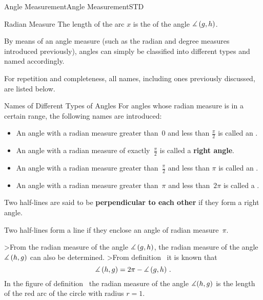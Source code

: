 \begin{MXContent}{Angle Measurement}{Angle Measurement}{STD}
\begin{MXInfo}{Radian Measure}
The length of the arc $x$ is the  of the
angle $\measuredangle \left( g, h \right)$.
\end{MXInfo}

By means of an angle measure (such as the radian and degree measures
introduced previously), angles can simply be classified into different types and named 
accordingly. 

For repetition and completeness, all names, including ones previously discussed, are listed 
below.

\begin{MXInfo}{Names of Different Types of Angles}
For angles whose radian measure is in a certain range, the following names 
are introduced:

\begin{itemize}
\item
An angle with a radian measure greater than~$0$ and less than $\frac{\pi}{2}$ is called an
.
       
\item
An angle with a radian measure of exactly~$\frac{\pi}{2}$ is called a \textbf{right angle}.
  
\item
An angle with a radian measure greater than~$\frac{\pi}{2}$ and less than $\pi$ is called 
an .
       
\item
An angle with a radian measure greater than~$\pi$ and less than~$2 \pi$ is called
a .
\end{itemize}

Two half-lines are said to be \textbf{perpendicular to each other} if they form a right angle.

Two half-lines form a line if they enclose an angle of radian measure~$\pi$.
\end{MXInfo}

>From the radian measure of the angle $\measuredangle \left( g, h \right)$, the 
radian measure of the angle $\measuredangle \left( h, g \right)$  can also be determined. 
>From definition~ it is known that
\[
   \Mmeasuredangle \left( h, g \right)
 = 2 \pi - \Mmeasuredangle \left( g, h \right)\,. %
\]
In the figure of definition~ the radian measure 
of the angle $\measuredangle(h,g)$ is the length of the red arc of the circle 
with radius $r = 1$.



\end{MXContent}
